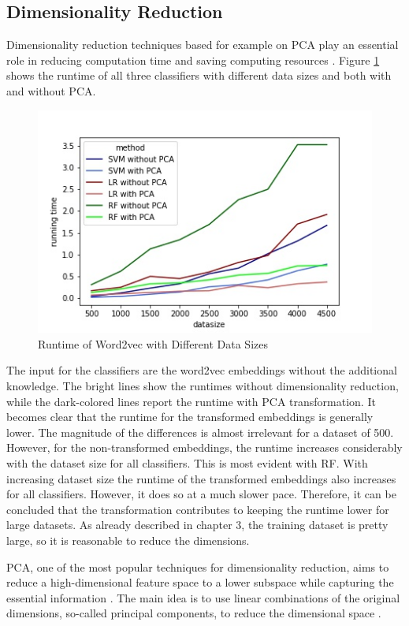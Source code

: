 \documentclass[12pt, a4paper, titlepage]{article}
\begin{document}
\subsection{Dimensionality Reduction}
Dimensionality reduction techniques based for example on \ac{PCA} play an essential role in reducing computation time and saving computing resources \citep{ayesha2020}. Figure \ref{fig: F6} shows the runtime of all three classifiers with different data sizes and both with and without \ac{PCA}. 
\begin{figure}[]
  \center
  \includegraphics[scale=0.5]{running_time_PCA.jpeg}
  \caption{\label{fig: F6} Runtime of Word2vec with Different Data Sizes}
\end{figure}
The input for the classifiers are the word2vec embeddings without the additional knowledge. The bright lines show the runtimes without dimensionality reduction, while the dark-colored lines report the runtime with \ac{PCA} transformation. It becomes clear that the runtime for the transformed embeddings is generally lower. The magnitude of the differences is almost irrelevant for a dataset of 500. However, for the non-transformed embeddings, the runtime increases considerably with the dataset size for all classifiers. This is most evident with \ac{RF}. With increasing dataset size the runtime of the transformed embeddings also increases for all classifiers. However, it does so at a much slower pace. Therefore, it can be concluded that the transformation contributes to keeping the runtime lower for large datasets. As already described in chapter 3, the training dataset is pretty large, so it is reasonable to reduce the dimensions. 

\ac{PCA}, one of the most popular techniques for dimensionality reduction, aims to reduce a high-dimensional feature space to a lower subspace while capturing the essential information \citep{tipping1999, bisong2019}. The main idea is to use linear combinations of the original dimensions, so-called principal components, to reduce the dimensional space \citep{bro2014,geladi2017}.
\end{document}

